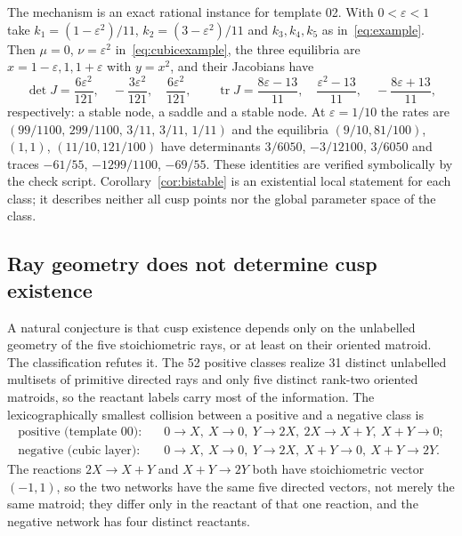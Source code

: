 \documentclass[11pt,a4paper]{article}
\theoremstyle{plain}
\theoremstyle{definition}
\theoremstyle{remark}
\numberwithin{equation}{section}
\newcommand{\tr}{\operatorname{tr}}
\begin{document}
The mechanism is an exact rational instance for template 02. With $0<\varepsilon<1$ take $k_1=(1-\varepsilon^2)/11$, $k_2=(3-\varepsilon^2)/11$ and $k_3,k_4,k_5$ as in~\eqref{eq:example}. Then $\mu=0$, $\nu=\varepsilon^2$ in~\eqref{eq:cubicexample}, the three equilibria are $x=1-\varepsilon,1,1+\varepsilon$ with $y=x^2$, and their Jacobians have
\[
 \det J=\frac{6\varepsilon^2}{121},\quad -\frac{3\varepsilon^2}{121},\quad \frac{6\varepsilon^2}{121},\qquad
 \tr J=\frac{8\varepsilon-13}{11},\quad \frac{\varepsilon^2-13}{11},\quad -\frac{8\varepsilon+13}{11},
\]
respectively: a stable node, a saddle and a stable node. At $\varepsilon=1/10$ the rates are $(99/1100,\,299/1100,\,3/11,\,3/11,\,1/11)$ and the equilibria $(9/10,81/100)$, $(1,1)$, $(11/10,121/100)$ have determinants $3/6050$, $-3/12100$, $3/6050$ and traces $-61/55$, $-1299/1100$, $-69/55$. These identities are verified symbolically by the check script. Corollary~\ref{cor:bistable} is an existential local statement for each class; it describes neither all cusp points nor the global parameter space of the class.

\subsection{Ray geometry does not determine cusp existence}\label{sec:rays}
A natural conjecture is that cusp existence depends only on the unlabelled geometry of the five stoichiometric rays, or at least on their oriented matroid. The classification refutes it. The 52 positive classes realize 31 distinct unlabelled multisets of primitive directed rays and only five distinct rank-two oriented matroids, so the reactant labels carry most of the information. The lexicographically smallest collision between a positive and a negative class is
\begin{align*}
 \text{positive (template 00):}&\quad 0\to X,\ X\to0,\ Y\to2X,\ 2X\to X+Y,\ X+Y\to0;\\
 \text{negative (cubic layer):}&\quad 0\to X,\ X\to0,\ Y\to2X,\ X+Y\to0,\ X+Y\to2Y .
\end{align*}
The reactions $2X\to X+Y$ and $X+Y\to2Y$ both have stoichiometric vector $(-1,1)$, so the two networks have the same five directed vectors, not merely the same matroid; they differ only in the reactant of that one reaction, and the negative network has four distinct reactants.
\end{document}
